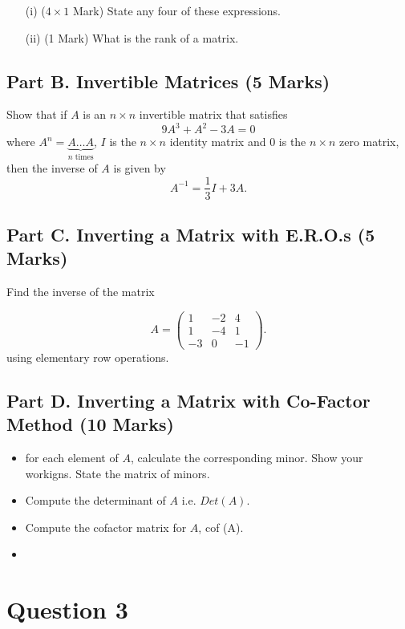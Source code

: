 \documentclass[a4paper,12pt]{article}
\begin{document}
	\begin{itemize}
		\item[(i)] ($4 \times 1$ Mark)
		State any four of these expressions.
		\item[(ii)] (1 Mark) What is the rank of a matrix.
	\end{itemize}
	\subsection*{Part B. Invertible Matrices (5 Marks)}	
	\noindent	Show that if $A$ is an $n\times n$ invertible matrix that satisfies 
	$$
	9A^3+A^2-3A=0
	$$
	where $A^n=\underbrace{A\ldots A}_{\textrm{$n$ times}}$, %
	$I$ is the $n\times n$  identity matrix and $0$ is the $n\times n$  zero matrix,
	then the inverse of $A$ is given by  %
	$$
	A^{-1}=\frac13I+3A.
	$$
	\subsection*{Part C. Inverting a Matrix with E.R.O.s (5 Marks)}	
	Find the inverse of the  matrix 
	
	\begin{equation*}
	A=\left( \begin{array}{rrr}
	1 & -2 & 4\\
	1 & -4 & 1\\
	-3 & 0 & -1
	\end{array} \right).
	\end{equation*}
	using elementary row operations.
	\subsection*{Part D. Inverting a Matrix with Co-Factor Method (10
		 Marks)}		
	\begin{itemize}
		\item for each element of $A$, calculate the corresponding minor. Show your workigns. 
		State the matrix of minors.
		\item Compute the determinant of $A$ i.e. $Det(A)$.
		\item Compute the cofactor matrix for $A$, cof (A).
		\item
	\end{itemize}
\newpage
\section*{Question 3}
\end{document}
